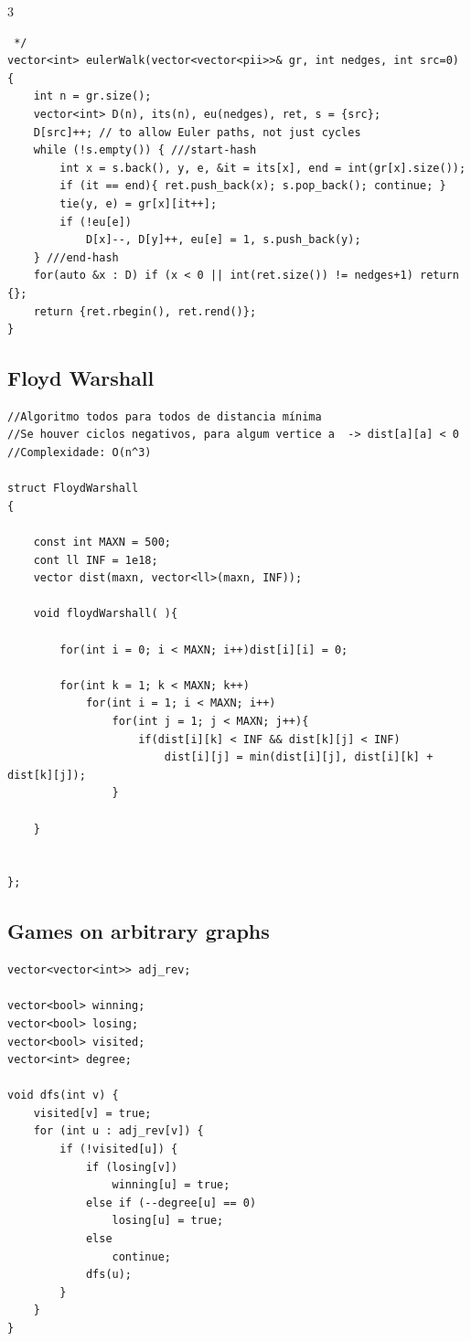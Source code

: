\documentclass[9pt, a4paper, notitlepage]{extreport}
\begin{document}
\begin{multicols}{3}
\begin{verbatim}
 */
vector<int> eulerWalk(vector<vector<pii>>& gr, int nedges, int src=0) {
	int n = gr.size();
	vector<int> D(n), its(n), eu(nedges), ret, s = {src};
	D[src]++; // to allow Euler paths, not just cycles
	while (!s.empty()) { ///start-hash
		int x = s.back(), y, e, &it = its[x], end = int(gr[x].size());
		if (it == end){ ret.push_back(x); s.pop_back(); continue; }
		tie(y, e) = gr[x][it++];
		if (!eu[e])
			D[x]--, D[y]++, eu[e] = 1, s.push_back(y);
	} ///end-hash
	for(auto &x : D) if (x < 0 || int(ret.size()) != nedges+1) return {};
	return {ret.rbegin(), ret.rend()};
}
\end{verbatim}

\subsection{Floyd Warshall}
\begin{verbatim}
//Algoritmo todos para todos de distancia mínima
//Se houver ciclos negativos, para algum vertice a  -> dist[a][a] < 0
//Complexidade: O(n^3)

struct FloydWarshall
{   

    const int MAXN = 500;
    cont ll INF = 1e18;
    vector dist(maxn, vector<ll>(maxn, INF));

    void floydWarshall( ){

        for(int i = 0; i < MAXN; i++)dist[i][i] = 0;

        for(int k = 1; k < MAXN; k++)
            for(int i = 1; i < MAXN; i++)
                for(int j = 1; j < MAXN; j++){
                    if(dist[i][k] < INF && dist[k][j] < INF)
                        dist[i][j] = min(dist[i][j], dist[i][k] + dist[k][j]);
                }
            
    }


};
\end{verbatim}

\subsection{Games on arbitrary graphs}
\begin{verbatim}
vector<vector<int>> adj_rev;

vector<bool> winning;
vector<bool> losing;
vector<bool> visited;
vector<int> degree;

void dfs(int v) {
    visited[v] = true;
    for (int u : adj_rev[v]) {
        if (!visited[u]) {
            if (losing[v])
                winning[u] = true;
            else if (--degree[u] == 0)
                losing[u] = true;
            else
                continue;
            dfs(u);
        }
    }
}


\end{verbatim}
\end{multicols}
\end{document}
